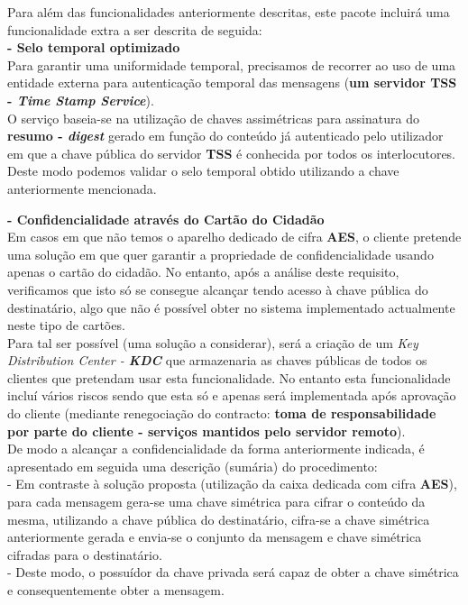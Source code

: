 \documentclass[times, 10pt,twocolumn]{article}
\begin{document}

Para al\'em das funcionalidades anteriormente descritas, este pacote incluir\'a uma funcionalidade extra a ser descrita de seguida:\\

\noindent \textbf{- Selo temporal optimizado}\\
\indent Para garantir uma uniformidade temporal, precisamos de recorrer ao uso de uma entidade externa para autentica\c{c}\~ao temporal das mensagens (\textbf{um servidor TSS - \emph{Time Stamp Service}}). \\
\indent O servi\c{c}o baseia-se na utiliza\c{c}\~ao de chaves assim\'etricas para assinatura do \textbf{resumo - \emph{digest}} gerado em fun\c{c}\~ao do conte\'udo j\'a autenticado pelo utilizador em que a chave p\'ublica do servidor \textbf{TSS} \'e conhecida por todos os interlocutores. Deste modo podemos validar o selo temporal obtido utilizando a chave anteriormente mencionada.


\noindent \textbf{- Confidencialidade atrav\'es do Cart\~ao do Cidad\~ao}\\
\indent Em casos em que n\~ao temos o aparelho dedicado de cifra \textbf{AES}, o cliente pretende uma solu\c{c}\~ao em que quer garantir a propriedade de confidencialidade usando apenas o cart\~ao do cidad\~ao. No entanto, ap\'os a an\'alise deste requisito, verificamos que isto s\'o se consegue alcan\c{c}ar tendo acesso \`a chave p\'ublica do destinat\'ario, algo que n\~ao \'e poss\'ivel obter no sistema implementado actualmente neste tipo de cart\~oes.\\
\indent Para tal ser poss\'ivel (uma solu\c{c}\~ao a considerar), ser\'a a cria\c{c}\~ao de um \emph{Key Distribution Center - \textbf{KDC}} que armazenaria as chaves p\'ublicas de todos os clientes que pretendam usar esta funcionalidade. No entanto esta funcionalidade inclu\'i v\'arios riscos sendo que esta s\'o e apenas ser\'a implementada ap\'os aprova\c{c}\~ao do cliente (mediante renegocia\c{c}\~ao do contracto: \textbf{toma de responsabilidade por parte do cliente - servi\c{c}os mantidos pelo servidor remoto}).\\
\indent De modo a alcan\c{c}ar a confidencialidade da forma anteriormente indicada, \'e apresentado em seguida uma descri\c{c}\~ao (sum\'aria) do procedimento:\\
\indent \indent - Em contraste \`a solu\c{c}\~ao proposta (utiliza\c{c}\~ao da caixa dedicada com cifra \textbf{AES}), para cada mensagem gera-se uma chave sim\'etrica para cifrar o conte\'udo da mesma, utilizando a chave p\'ublica do destinat\'ario, cifra-se a chave simétrica anteriormente gerada e envia-se o conjunto da mensagem e chave simétrica cifradas para o destinatário.\\
\indent \indent - Deste modo, o possu\'idor da chave privada ser\'a capaz de obter a chave sim\'etrica e consequentemente obter a mensagem.\\
\end{document}
